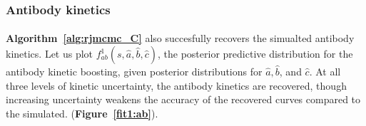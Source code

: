 \documentclass{article}
\begin{document}
\subsubsection{Antibody kinetics}
\paragraph{} \textbf{Algorithm~\ref{alg:rjmcmc_C}} also succesfully recovers the simualted antibody kinetics. Let us plot $f^1_{ab}(s, \hat{a}, \hat{b}, \hat{c})$, the posterior predictive distribution for the antibody kinetic boosting, given posterior distributions for $ \hat{a}, \hat{b}$, and $\hat{c}$. At all three levels of kinetic uncertainty, the antibody kinetics are recovered, though increasing uncertainty weakens the accuracy of the recovered curves compared to the simulated. (\textbf{Figure~\ref{fit1:ab}}).
\end{document}
